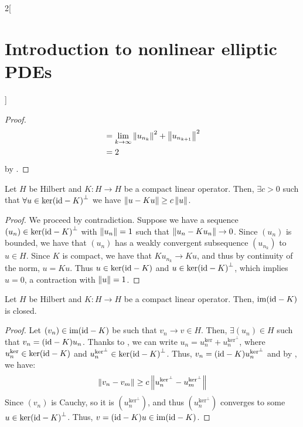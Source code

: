 \documentclass[../../../main_math.tex]{subfiles}
\begin{document}
\begin{multicols}{2}[\section{Introduction to nonlinear elliptic PDEs}]
\begin{proof}
\begin{align*}
        & =\lim_{k\to\infty}\left\|u_{n_k}\right\|^2+\left\|u_{n_{k+1}}\right\|^2 \\
        & =2
    \end{align*}
    by .
  \end{proof}
  \begin{lemma}\label{INEPDE:lemma2_fredholm}
    Let $H$ be Hilbert and $K:H\to H$ be a compact linear operator. Then, $\exists c>0$ such that $\forall u\in {\ker(\mathrm{id}-K)}^{\perp}$ we have $\left\|u-Ku\right\|\geq c\left\|u\right\|$.
  \end{lemma}
  \begin{proof}
    We proceed by contradiction. Suppose we have a sequence $(u_n)\in {\ker(\mathrm{id}-K)}^{\perp}$ with $\left\|u_n\right\|=1$ such that $\left\|u_n-Ku_n\right\|\to 0$. Since $(u_n)$ is bounded, we have that $(u_n)$ has a weakly convergent subsequence $(u_{n_k})$ to $u\in H$. Since $K$ is compact, we have that $Ku_{n_k}\to Ku$, and thus by continuity of the norm, $u=Ku$. Thus $u\in \ker(\mathrm{id}-K)$ and $u\in {\ker(\mathrm{id}-K)}^{\perp}$, which implies $u=0$, a contraction with $\left\|u\right\|=1$.
  \end{proof}
  \begin{lemma}\label{INEPDE:lemma3_fredholm}
    Let $H$ be Hilbert and $K:H\to H$ be a compact linear operator. Then, $\operatorname{im}(\mathrm{id}-K)$ is closed.
  \end{lemma}
  \begin{proof}
    Let $(v_n)\in \operatorname{im}(\mathrm{id}-K)$ be such that $v_n\to v\in H$. Then, $\exists (u_n)\in H$ such that $v_n=(\mathrm{id}-K)u_n$. Thanks to , we can write $u_n=u_n^{\text{ker}}+ u_n^{\text{ker}^\perp}$, where $u_n^{\text{ker}}\in \ker(\mathrm{id}-K)$ and $u_n^{\text{ker}^\perp}\in {\ker(\mathrm{id}-K)}^{\perp}$. Thus, $v_n=(\mathrm{id}-K)u_n^{\text{ker}^\perp}$ and by , we have:
    $$
      \left\|v_n-v_m\right\|\geq c\left\|u_n^{\text{ker}^\perp}-u_m^{\text{ker}^\perp}\right\|
    $$
    Since $(v_n)$ is Cauchy, so it is $(u_n^{\text{ker}^\perp})$, and thus $(u_n^{\text{ker}^\perp})$ converges to some $u\in {\ker(\mathrm{id}-K)}^{\perp}$. Thus, $v=(\mathrm{id}-K)u\in \operatorname{im}(\mathrm{id}-K)$.
  \end{proof}

\end{multicols}
\end{document}
